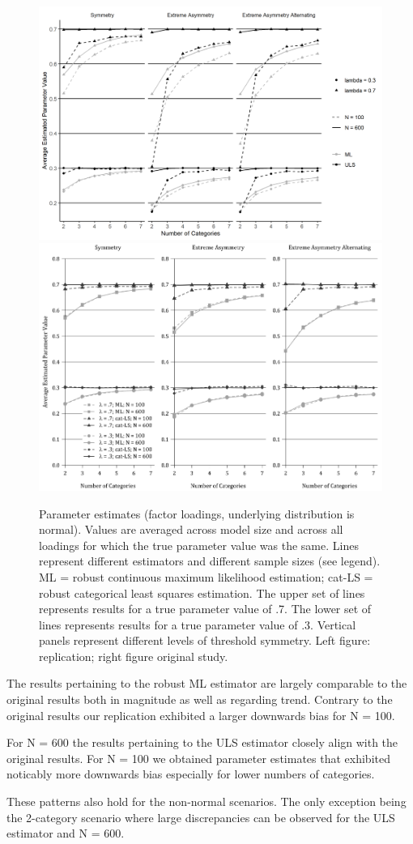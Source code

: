 \documentclass[10,a4paperpaper,]{article}
\begin{document}
\begin{figure}
\includegraphics[width=0.49\linewidth]{./figures/fig_3} \includegraphics[width=0.49\linewidth]{./figures/fig3_original} \caption{Parameter estimates (factor loadings, underlying distribution is normal). Values are averaged across model size and across all loadings for which the true parameter value was the same. Lines represent different estimators and different sample sizes (see legend). ML = robust continuous maximum likelihood estimation; cat-LS = robust categorical least squares estimation. The upper set of lines represents results for a true parameter value of .7. The lower set of lines represents results for a true parameter value of .3. Vertical panels represent different levels of threshold symmetry. Left figure: replication; right figure original study.}\label{fig:fig3}
\end{figure}

The results pertaining to the robust ML estimator are largely comparable
to the original results both in magnitude as well as regarding trend.
Contrary to the original results our replication exhibited a larger
downwards bias for N = 100.

For N = 600 the results pertaining to the ULS estimator closely align
with the original results. For N = 100 we obtained parameter estimates
that exhibited noticably more downwards bias especially for lower
numbers of categories.

These patterns also hold for the non-normal scenarios. The only
exception being the 2-category scenario where large discrepancies can be
observed for the ULS estimator and N = 600.
\end{document}
